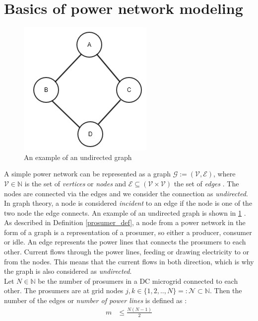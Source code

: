 \section{Basics of power network modeling}
\label{sec:power_network}
\begin{figure}[h]
\centering
    \includegraphics[scale=0.8]{pictures/undirected_graph.png}
    \caption{An example of an undirected graph}
    \label{graph}
\end{figure}
\par A simple power network can be represented as a graph $\mathcal{G}:=(\mathcal{V},\mathcal{E})$, where $\mathcal{V} \in \mathbb{N}$ is the set of \textit{vertices} or \textit{nodes} and $\mathcal{E} \subseteq (\mathcal{V} \times \mathcal{V})$ the set of \textit{edges} \cite{graph_theory}. The nodes are connected via the edges and we consider the connection as \textit{undirected}. In graph theory, a node is considered \textit{incident} to an edge if the node is one of the two node the edge connects. An example of an undirected graph is shown in \ref{graph} \cite{un_graph}. 
\\As described in Definition \ref{prosumer_def}, a node from a power network in the form of a graph is a representation of a prosumer, so either a producer, consumer or idle. An edge represents the power lines that connects the prosumers to each other. Current flows through the power lines, feeding or drawing electricity to or from the nodes. This means that the current flows in both direction, which is why the graph is also considered as \textit{undirected}. 
\\ Let $N \in \mathbb{N}$ be the number of prosumers in a DC microgrid connected to each other. The prosumers are at grid nodes $j,k \in \{1,2,..,N\} =: \mathcal{N} \subset \mathbb{N}$. Then the number of the edges or \textit{number of power lines} is defined as \cite{lia_master}: 
\begin{align*}
    m &\leq \frac{N(N-1)}{2}
\end{align*}
